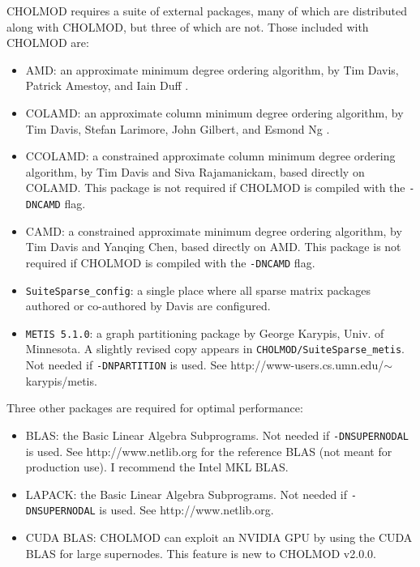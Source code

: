 \documentclass[11pt]{article}
\begin{document}
CHOLMOD requires a suite of external packages, many of which are distributed
along with CHOLMOD, but three of which are not.  Those included with CHOLMOD
are:

\begin{itemize}
\item AMD: an approximate minimum degree ordering algorithm,
    by Tim Davis, Patrick Amestoy, and Iain Duff
    \cite{AmestoyDavisDuff96,AmestoyDavisDuff03}.
\item COLAMD: an approximate column minimum degree ordering algorithm,
    by Tim Davis, Stefan Larimore, John Gilbert, and Esmond Ng
    \cite{DavisGilbertLarimoreNg00_algo,DavisGilbertLarimoreNg00}.
\item CCOLAMD: a constrained approximate column minimum degree ordering
    algorithm, by Tim Davis and Siva Rajamanickam, based directly on COLAMD.
    This package is not required if CHOLMOD is compiled with the {\tt -DNCAMD}
    flag.
\item CAMD: a constrained approximate minimum degree ordering algorithm, by Tim
    Davis and Yanqing Chen, based directly on AMD.  This package is not
    required if CHOLMOD is compiled with the {\tt -DNCAMD} flag.
\item {\tt SuiteSparse\_config}: a single place where all sparse matrix
    packages authored or co-authored by Davis are configured.
\item {\tt METIS 5.1.0}: a graph partitioning package by George Karypis,
    Univ. of Minnesota.  A slightly revised copy appears in
    {\tt CHOLMOD/SuiteSparse\_metis}.  Not needed if {\tt -DNPARTITION} is
    used.  See http://www-users.cs.umn.edu/$\sim$karypis/metis.
\end{itemize}

Three other packages are required for optimal performance:
\begin{itemize}

\item BLAS: the Basic Linear Algebra Subprograms.
    Not needed if {\tt -DNSUPERNODAL} is used.
    See http://www.netlib.org for the reference BLAS (not meant for production
    use).  I recommend the Intel MKL BLAS.
\item LAPACK: the Basic Linear Algebra Subprograms.
    Not needed if {\tt -DNSUPERNODAL} is used.
    See http://www.netlib.org.
\item CUDA BLAS:  CHOLMOD can exploit an NVIDIA GPU by using the CUDA BLAS
    for large supernodes.  This feature is new to CHOLMOD v2.0.0.
\end{itemize}
\end{document}

